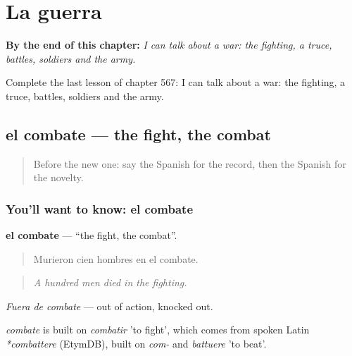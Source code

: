 
\chapter{La guerra}
\label{ch:es-la-guerra}

\begin{chapteropening}
\textbf{By the end of this chapter:} \emph{I can talk about a war: the fighting, a truce, battles, soldiers and the army.}

Complete the last lesson of chapter 567: I can talk about a war: the fighting, a truce, battles, soldiers and the army.
\end{chapteropening}

\section[el combate]{el combate — the fight, the combat}

\label{lesson:ES-C567-combate}



\begin{quote}
Before the new one: say the Spanish for the record, then the Spanish for the novelty.
\end{quote}

\subsection*{You'll want to know: el combate}
\textbf{el combate} — \textquotedblleft{}the fight, the combat\textquotedblright{}.

\begin{quote}
Murieron cien hombres en el combate.
\end{quote}

\begin{quote}
\emph{A hundred men died in the fighting.}
\end{quote}

\emph{Fuera de combate} — out of action, knocked out.

\begin{cousinweb}
\emph{combate} is built on \emph{combatir} 'to fight', which comes from spoken Latin \emph{*combattere} (EtymDB), built on \emph{com-} and \emph{battuere} 'to beat'.
\end{cousinweb}

